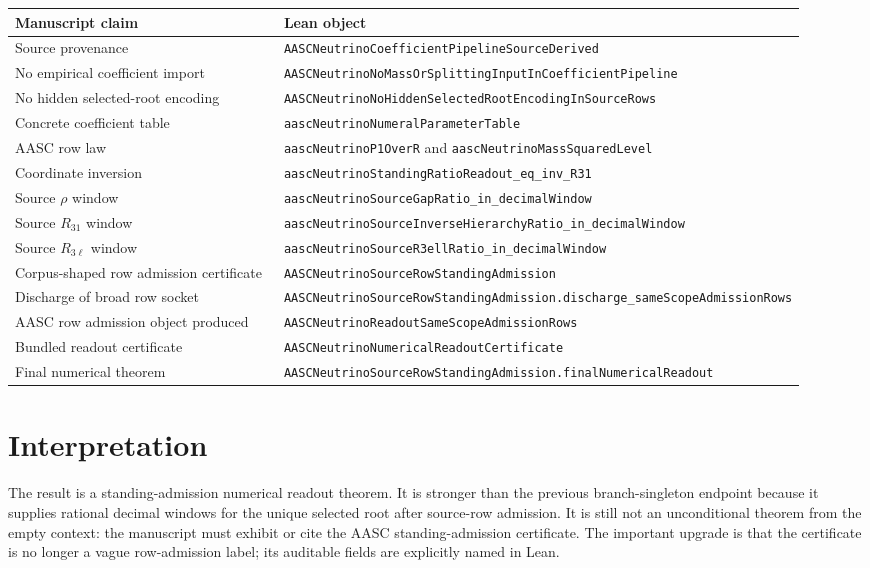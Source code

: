 \documentclass[11pt]{article}
\begin{document}
\begin{center}
\begin{tabular}{p{0.44\linewidth}p{0.48\linewidth}}
\toprule
Manuscript claim & Lean object \\
\midrule
Source provenance & \texttt{AASCNeutrinoCoefficientPipelineSourceDerived} \\
No empirical coefficient import & \texttt{AASCNeutrinoNoMassOrSplittingInputInCoefficientPipeline} \\
No hidden selected-root encoding & \texttt{AASCNeutrinoNoHiddenSelectedRootEncodingInSourceRows} \\
Concrete coefficient table & \texttt{aascNeutrinoNumeralParameterTable} \\
AASC row law & \texttt{aascNeutrinoP1OverR} and \texttt{aascNeutrinoMassSquaredLevel} \\
Coordinate inversion & \texttt{aascNeutrinoStandingRatioReadout\_eq\_inv\_R31} \\
Source \(\rho\) window & \texttt{aascNeutrinoSourceGapRatio\_in\_decimalWindow} \\
Source \(R_{31}\) window & \texttt{aascNeutrinoSourceInverseHierarchyRatio\_in\_decimalWindow} \\
Source \(R_{3\ell}\) window & \texttt{aascNeutrinoSourceR3ellRatio\_in\_decimalWindow} \\
Corpus-shaped row admission certificate & \texttt{AASCNeutrinoSourceRowStandingAdmission} \\
Discharge of broad row socket & \texttt{AASCNeutrinoSourceRowStandingAdmission.discharge\_sameScopeAdmissionRows} \\
AASC row admission object produced & \texttt{AASCNeutrinoReadoutSameScopeAdmissionRows} \\
Bundled readout certificate & \texttt{AASCNeutrinoNumericalReadoutCertificate} \\
Final numerical theorem & \texttt{AASCNeutrinoSourceRowStandingAdmission.finalNumericalReadout} \\
\bottomrule
\end{tabular}
\end{center}

\section{Interpretation}

The result is a standing-admission numerical readout theorem.  It is stronger
than the previous branch-singleton endpoint because it supplies rational
decimal windows for the unique selected root after source-row admission.  It
is still not an unconditional theorem from the empty context: the manuscript
must exhibit or cite the AASC standing-admission certificate.  The important
upgrade is that the certificate is no longer a vague row-admission label; its
auditable fields are explicitly named in Lean.
\end{document}

